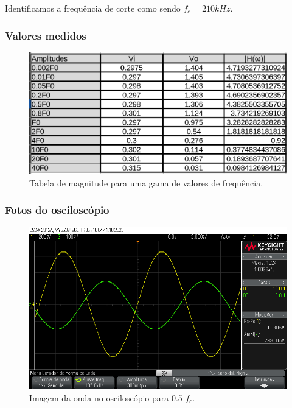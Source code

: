 Identificamos a frequência de corte como sendo $f_c = 210 kHz$.


\subsubsection{Valores medidos}


\begin{figure}[H]
    \centering
    \includegraphics[width=1\columnwidth]{images/valores1.png}
    \caption{Tabela de magnitude para uma gama de valores de frequência.}
\end{figure}


\subsubsection{Fotos do osciloscópio}


\begin{figure}[H]
    \centering
    \includegraphics[width=1\columnwidth]{images/exemplo1_meio_fc.png}
    \caption{Imagem da onda no osciloscópio para 0.5 $f_c$.}
\end{figure}


